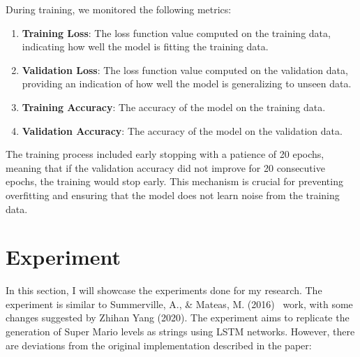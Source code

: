 \documentclass[runningheads]{llncs}
\begin{document}
During training, we monitored the following metrics:

\begin{enumerate}
\item \textbf{Training Loss}: The loss function value computed on the training data, indicating how well the model is fitting the training data.\\

\item \textbf{Validation Loss}: The loss function value computed on the validation data, providing an indication of how well the model is generalizing to unseen data.\\

\item \textbf{Training Accuracy}: The accuracy of the model on the training data.\\

\item \textbf{Validation Accuracy}: The accuracy of the model on the validation data.\\
\end{enumerate}

The training process included early stopping with a patience of 20 epochs, meaning that if the validation accuracy did not improve for 20 consecutive epochs, the training would stop early. This mechanism is crucial for preventing overfitting and ensuring that the model does not learn noise from the training data.



\section{Experiment}
In this section, I will showcase the experiments done for my research. The experiment is similar to Summerville, A., \& Mateas, M. (2016)~\cite{ref_article14} work, with some changes suggested by Zhihan Yang (2020)\cite{ref_article30}. The experiment aims to replicate the generation of Super Mario levels as strings using LSTM networks. However, there are deviations from the original implementation described in the paper:
\end{document}
